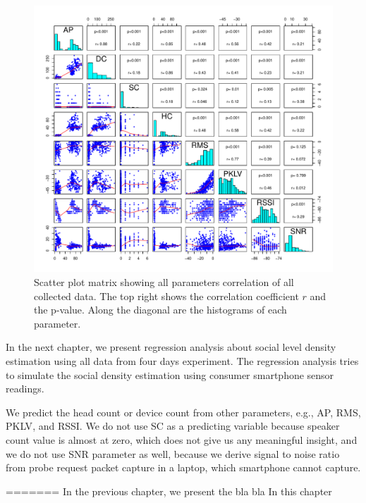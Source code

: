 	\begin{figure}[h]
		\begin{adjustwidth}{-3cm}{}
		\centering
		\includegraphics[width=1.3\textwidth]{./img/result/all-result}
		\end{adjustwidth}
		\caption[Scatter plot matrix showing all parameters correlation.]
		{Scatter plot matrix showing all parameters correlation of all collected data. The top right shows the correlation coefficient $r$ and the p-value. Along the diagonal are the histograms of each parameter.}
		\label{fig:scatterplot-matrix}
	\end{figure}

	In the next chapter, we present regression analysis about social level density estimation using all data from four days experiment. The regression analysis tries to simulate the social density estimation using consumer smartphone sensor readings.

	We predict the head count or device count from other parameters, e.g., \ac{AP}, \ac{RMS}, \ac{PKLV}, and \ac{RSSI}. We do not use \ac{SC} as a predicting variable because speaker count value is almost at zero, which does not give us any meaningful insight, and we do not use \ac{SNR} parameter as well, because we derive signal to noise ratio from probe request packet capture in a laptop, which smartphone cannot capture.

=======
In the previous chapter, we present the bla bla
In this chapter

